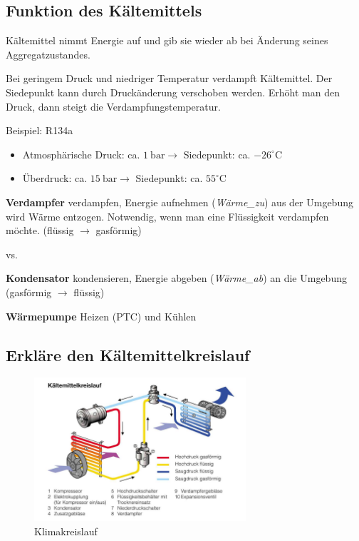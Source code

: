 \subsection{Funktion des
Kältemittels}\label{funktion-des-kaeltemittels}

Kältemittel nimmt Energie auf und gib sie wieder ab bei Änderung seines
Aggregatzustandes.

Bei geringem Druck und niedriger Temperatur verdampft Kältemittel. Der
Siedepunkt kann durch Druckänderung verschoben werden. Erhöht man den
Druck, dann steigt die Verdampfungstemperatur.

Beispiel: R134a

\begin{itemize}
\item
  Atmosphärische Druck: ca. $1~\text{bar} \to$ Siedepunkt: ca.
  $-26^\circ \text{C}$
\item
  Überdruck: ca. $15~\text{bar} \to$ Siedepunkt: ca.
  $55^\circ \text{C}$
\end{itemize}

\textbf{Verdampfer} verdampfen, Energie aufnehmen (\emph{Wärme\_zu}) aus
der Umgebung wird Wärme entzogen. Notwendig, wenn man eine Flüssigkeit
verdampfen möchte. (flüssig $\to$ gasförmig)

vs.

\textbf{Kondensator} kondensieren, Energie abgeben (\emph{Wärme\_ab}) an
die Umgebung (gasförmig $\to$ flüssig)

\textbf{Wärmepumpe} Heizen (PTC) und Kühlen

\newpage

\subsection{Erkläre den
Kältemittelkreislauf}\label{erklaere-den-kaeltemittelkreislauf}

\begin{figure}[!ht]%
\centering
\includegraphics[width=0.7\textwidth]{images/Skizze/Klimakreislauf-1.pdf}
\caption{Klimakreislauf}
\end{figure}

